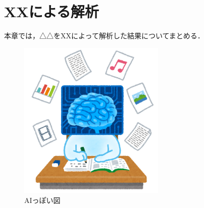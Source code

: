 \chapter{XXによる解析}\label{chap:3_main1}
本章では，△△をXXによって解析した結果についてまとめる．

\begin{figure}[htb]
  \centering
  \includegraphics[clip,width=7cm]{../fig/Chapter3/ai_study_kikaigakusyu.png}
  \caption{AIっぽい図}
  \label{fig:3_ai}
\end{figure}
